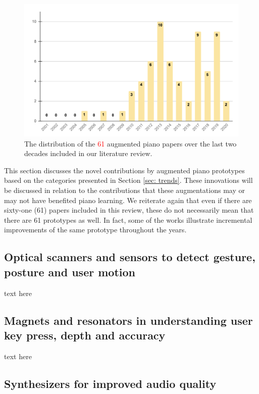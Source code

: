 \documentclass[sigchi, review]{acmart}
\newcommand{\red}[1]{\textcolor{red}{#1}}
\begin{document}
\begin{figure}[t]
    \centering
    \includegraphics[width=.45\textwidth]{figures/yearchart.png}
    \caption{The distribution of the \red{61} augmented piano papers over the last two decades included in our literature review. %
    }
    \label{fig:doublechart}
\end{figure}  
This section discusses the novel contributions by augmented piano prototypes based on the categories presented in Section \ref{sec: trends}. These innovations will be discussed in relation to the contributions that these augmentations may or may not have benefited piano learning. We reiterate again that even if there are sixty-one (61) papers included in this review, these do not necessarily mean that there are 61 prototypes as well. In fact, some of the works illustrate incremental improvements of the same prototype throughout the years. 

\subsection{Optical scanners and sensors to detect gesture, posture and user motion}
\label{subsec: gesture}
 text here

\subsection{Magnets and resonators in understanding user key press, depth and accuracy}
\label{subsec: magnets}

text here 

\subsection{Synthesizers for improved audio quality}
\label{subsec: synth}
\end{document}
